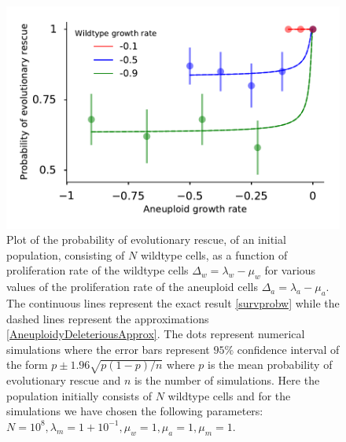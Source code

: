 \documentclass[12pt]{extarticle}
\begin{document}
\begin{figure}[!t]
 \vspace*{1\baselineskip}
\includegraphics[width=1\textwidth]{Figures/P_est_divergenceLargePopulation.pdf}
\caption{Plot of the probability of evolutionary rescue, of an initial population, consisting of $N$ wildtype cells, as a function of proliferation rate of the wildtype cells $\Delta_w=\lambda_w-\mu_w$ for various values of the proliferation rate of the aneuploid cells $\Delta_a=\lambda_a-\mu_a$. The continuous lines represent the exact result \eqref{survprobw} while the dashed lines represent the approximations \eqref{AneuploidyDeleteriousApprox}. The dots represent numerical simulations where the error bars represent $95\%$ confidence interval of the form $p\pm1.96\sqrt{p\left(1-p\right)/n}$ where $p$ is the mean probability of evolutionary rescue and $n$ is the number of simulations.  Here the population initially consists of $N$ wildtype cells and for the simulations we have chosen the following parameters: $N=10^8,\lambda_m=1+10^{-1},\mu_w=1,\mu_a=1,\mu_m=1$. }
\label{P_est_large_N}
\end{figure}
\end{document}
